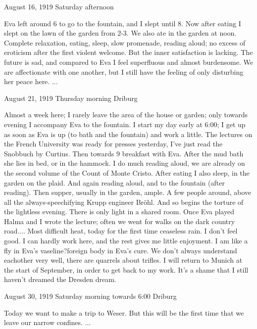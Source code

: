 August 16, 1919
Saturday afternoon

Eva left around 6 to go to the fountain, and I slept until 8. Now after eating I slept on the lawn of the garden from 2-3. We also ate in the garden at noon. Complete relaxation, eating, sleep, slow promenade, reading aloud; no excess of eroticism after the first violent welcome. But the inner satisfaction is lacking. The future is sad,  and compared to Eva I feel superfluous and almost burdensome. We are affectionate with one another, but I still have the feeling of only disturbing her peace here. {...}

August 21, 1919
Thursday morning
Driburg

Almost a week here; I rarely leave the area of the house or garden; only towards evening I accompany Eva to the fountain. I start my day early at 6:00; I get up as soon as Eva is up (to bath and the fountain) and work a little. The lectures on the French University was ready for presses yesterday, I've just read the Snobbuch by Curtius. Then towards 9 breakfast with Eva. After the mud bath she lies in bed, or in the hammock. I do much reading aloud, we are already on the second volume of the Count of Monte Cristo. After eating I also sleep, in the garden on the plaid. And again reading aloud, and to the fountain (after reading). Then supper, usually in the garden, ample. A few people around, above all the always-speechifying Krupp engineer Bröhl. And so begins the torture of the lightless evening. There is only light in a shared room. Once Eva played Halma and I wrote the lecture; often we went for walks on the dark country road{...}. Most difficult heat, today for the first time ceaseless rain. I don't feel good. I can hardly work here, and the rest gives me little enjoyment. I am like a {fly in Eva's vaseline?}{foreign body in Eva's cure}. We don't always understand eachother very well, there are quarrels about trifles. I will return to Munich at the start of September, in order to get back to my work. It's a shame that I still haven't dreamed the Dresden dream.

August 30, 1919
Saturday morning towards 6:00
Driburg

Today we want to make a trip to Weser. But this will be the first time that we leave our narrow confines. {...}

